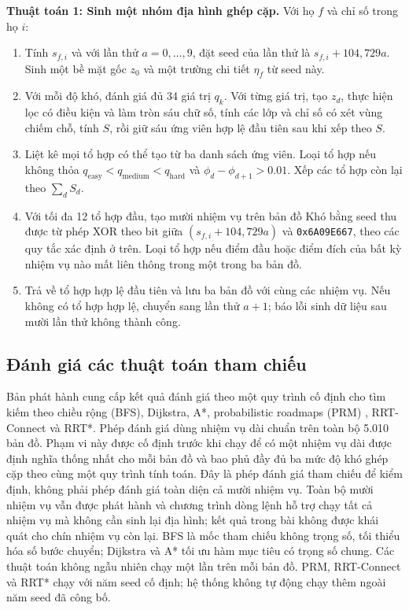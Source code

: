 \documentclass[11pt]{article}
\begin{document}
\noindent\textbf{Thuật toán 1: Sinh một nhóm địa hình ghép cặp.}
Với họ $f$ và chỉ số trong họ $i$:
\begin{enumerate}
  \item Tính $s_{f,i}$ và với lần thử $a=0,\ldots,9$, đặt seed của lần thử là
  $s_{f,i}+104{,}729a$. Sinh một bề mặt gốc $z_0$ và một trường chi tiết
  $\eta_f$ từ seed này.
  \item Với mỗi độ khó, đánh giá đủ 34 giá trị $q_k$. Với từng giá trị, tạo
  $z_d$, thực hiện lọc có điều kiện và làm tròn sáu chữ số, tính các lớp và chỉ số
  có xét vùng chiếm chỗ, tính $S$, rồi giữ sáu ứng viên hợp lệ đầu tiên sau khi xếp
  theo $S$.
  \item Liệt kê mọi tổ hợp có thể tạo từ ba danh sách ứng viên. Loại tổ hợp nếu không
  thỏa $q_{\mathrm{easy}}<q_{\mathrm{medium}}<q_{\mathrm{hard}}$ và
  $\phi_d-\phi_{d+1}>0.01$. Xếp các tổ hợp còn lại theo $\sum_d S_d$.
  \item Với tối đa 12 tổ hợp đầu, tạo mười nhiệm vụ trên bản đồ Khó bằng
  seed thu được từ phép XOR theo bit giữa $(s_{f,i}+104{,}729a)$ và
  \texttt{0x6A09E667}, theo các quy tắc xác định ở trên. Loại tổ hợp nếu
  điểm đầu hoặc điểm đích của bất kỳ nhiệm vụ nào mất liên
  thông trong một trong ba bản đồ.
  \item Trả về tổ hợp hợp lệ đầu tiên và lưu ba bản đồ với cùng các
  nhiệm vụ. Nếu không có tổ hợp hợp lệ, chuyển sang lần thử $a+1$; báo lỗi sinh
  dữ liệu sau mười lần thử không thành công.
\end{enumerate}

\subsection{Đánh giá các thuật toán tham chiếu}

Bản phát hành cung cấp kết quả đánh giá theo một quy trình cố định cho tìm kiếm theo chiều
rộng (BFS),
Dijkstra\cite{dijkstra}, A*\cite{astar}, probabilistic roadmaps (PRM)
\cite{prm}, RRT-Connect\cite{rrtconnect} và RRT*\cite{rrtstar}. Phép đánh giá dùng
nhiệm vụ dài chuẩn trên toàn bộ 5.010 bản đồ. Phạm vi này được cố định trước
khi chạy để có một nhiệm vụ dài được định nghĩa thống nhất cho mỗi bản đồ và
bao phủ đầy đủ ba mức độ khó ghép
cặp theo cùng một quy trình tính toán. Đây là phép đánh giá tham chiếu để kiểm định,
không phải phép đánh giá toàn diện cả mười nhiệm vụ. Toàn bộ mười nhiệm vụ vẫn
được phát hành và chương trình dòng lệnh hỗ trợ chạy tất cả nhiệm vụ mà không
cần sinh lại địa hình; kết quả trong bài không được khái quát cho chín nhiệm vụ
còn lại. BFS là mốc tham chiếu không trọng số, tối thiểu hóa số bước chuyển;
Dijkstra và A* tối ưu hàm mục tiêu có trọng số chung. Các thuật toán không ngẫu nhiên
chạy một lần trên mỗi bản đồ. PRM, RRT-Connect và RRT* chạy với năm seed cố định;
hệ thống không tự động chạy thêm ngoài năm seed đã công bố.
\end{document}

